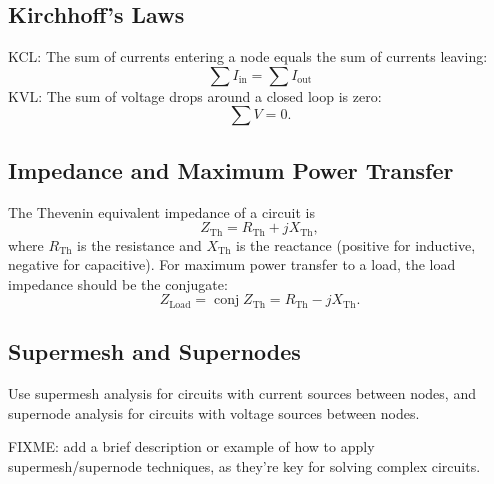 \documentclass[letterpaper]{scrartcl}
\DeclareMathOperator{\conj}{conj}
\newcommand{\thev}[0]{\mathrm{Th}}
\newcommand{\load}[0]{\mathrm{Load}}
\begin{document}
\subsection*{Kirchhoff's Laws}
KCL: The sum of currents entering a node equals the sum of currents leaving:
\begin{equation}\label{eqn:karlCircuitsCheatSheet:480}
\sum I_{\text{in}} = \sum I_{\text{out}}
\end{equation}
KVL: The sum of voltage drops around a closed loop is zero:
\begin{equation}\label{eqn:karlCircuitsCheatSheet:500}
\sum V = 0.
\end{equation}

\subsection*{Impedance and Maximum Power Transfer}
The Thevenin equivalent impedance of a circuit is
\begin{equation}\label{eqn:karlCircuitsCheatSheet:340}
Z_\thev = R_\thev + j X_\thev,
\end{equation}
where \( R_\thev \) is the resistance and \( X_\thev \) is the reactance (positive for inductive, negative for capacitive). For maximum power transfer to a load, the load impedance should be the conjugate:
\begin{equation}\label{eqn:karlCircuitsCheatSheet:360}
Z_\load = \conj{Z_\thev} = R_\thev - j X_\thev.
\end{equation}

\subsection*{Supermesh and Supernodes}
Use supermesh analysis for circuits with current sources between nodes, and supernode analysis for circuits with voltage sources between nodes.

FIXME: add a brief description or example of how to apply supermesh/supernode techniques, as they’re key for solving complex circuits.
\end{document}
